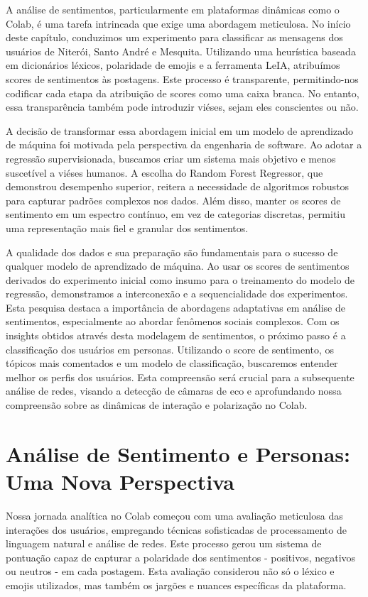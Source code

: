 A análise de sentimentos, particularmente em plataformas dinâmicas como o Colab, é uma tarefa intrincada que exige uma abordagem meticulosa. No início deste capítulo, conduzimos um experimento para classificar as mensagens dos usuários de Niterói, Santo André e Mesquita. Utilizando uma heurística baseada em dicionários léxicos, polaridade de emojis e a ferramenta LeIA, atribuímos scores de sentimentos às postagens. Este processo é transparente, permitindo-nos codificar cada etapa da atribuição de scores como uma caixa branca. No entanto, essa transparência também pode introduzir viéses, sejam eles conscientes ou não.

A decisão de transformar essa abordagem inicial em um modelo de aprendizado de máquina foi motivada pela perspectiva da engenharia de software. Ao adotar a regressão supervisionada, buscamos criar um sistema mais objetivo e menos suscetível a viéses humanos. A escolha do Random Forest Regressor, que demonstrou desempenho superior, reitera a necessidade de algoritmos robustos para capturar padrões complexos nos dados. Além disso, manter os scores de sentimento em um espectro contínuo, em vez de categorias discretas, permitiu uma representação mais fiel e granular dos sentimentos.

A qualidade dos dados e sua preparação são fundamentais para o sucesso de qualquer modelo de aprendizado de máquina. Ao usar os scores de sentimentos derivados do experimento inicial como insumo para o treinamento do modelo de regressão, demonstramos a interconexão e a sequencialidade dos experimentos. Esta pesquisa destaca a importância de abordagens adaptativas em análise de sentimentos, especialmente ao abordar fenômenos sociais complexos. Com os insights obtidos através desta modelagem de sentimentos, o próximo passo é a classificação dos usuários em personas. Utilizando o score de sentimento, os tópicos mais comentados e um modelo de classificação, buscaremos entender melhor os perfis dos usuários. Esta compreensão será crucial para a subsequente análise de redes, visando a detecção de câmaras de eco e aprofundando nossa compreensão sobre as dinâmicas de interação e polarização no Colab.

\section{Análise de Sentimento e Personas: Uma Nova Perspectiva}

Nossa jornada analítica no Colab começou com uma avaliação meticulosa das interações dos usuários, empregando técnicas sofisticadas de processamento de linguagem natural e análise de redes. Este processo gerou um sistema de pontuação capaz de capturar a polaridade dos sentimentos - positivos, negativos ou neutros - em cada postagem. Esta avaliação considerou não só o léxico e emojis utilizados, mas também os jargões e nuances específicas da plataforma.

